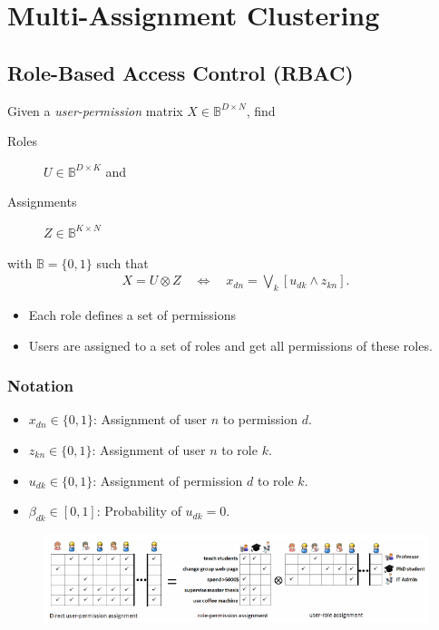 \section{Multi-Assignment Clustering}

\subsection{Role-Based Access Control (RBAC)}
Given a \emph{user-permission} matrix $X\in \mathbb B^{D\times N}$, find
\begin{description}
\item[Roles] $U\in \mathbb B^{D\times K}$ and
\item[Assignments] $Z\in \mathbb B^{K\times N}$ 
\end{description}
with $\mathbb B=\{0,1\}$ such that
\begin{align*}
    X = U \otimes Z \quad \Leftrightarrow \quad x_{dn} = \bigvee_k [u_{dk} \land z_{kn}].
\end{align*}
\begin{itemize}
\item Each role defines a set of permissions
\item Users are assigned to a set of roles and get all permissions of these roles.
\end{itemize}

\subsubsection{Notation}
\begin{itemize}
\item $x_{dn} \in \{0,1\}$: Assignment of user $n$ to permission $d$.
\item $z_{kn} \in \{0,1\}$: Assignment of user $n$ to role $k$.
\item $u_{dk} \in \{0,1\}$: Assignment of permission $d$ to role $k$.
\item $\beta_{dk} \in [0,1]$: Probability of $u_{dk} = 0$.
\end{itemize}
\begin{figure}[H]
    \centering
    \includegraphics[width=\textwidth]{img/multi_assignment_rbac}
\end{figure}

